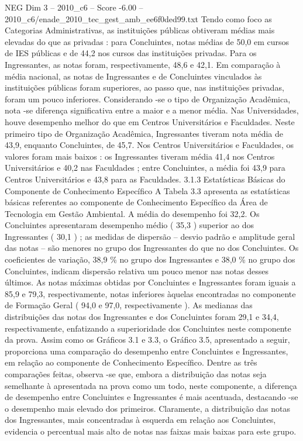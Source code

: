\begin{textsample}{NEG Dim 3 – 2010\_c6 – Score -6.00 – 2010\_c6/enade\_2010\_tec\_gest\_amb\_ee6f0ded99.txt}
Tendo como foco as Categorias Administrativas, as instituições públicas obtiveram médias mais elevadas do que as privadas : para Concluintes, notas médias de 50,0 em cursos de IES públicas e de 44,2 nos cursos das instituições privadas.
Para os Ingressantes, as notas foram, respectivamente, 48,6 e 42,1.
Em comparação à média nacional, as notas de Ingressantes e de Concluintes vinculados às instituições públicas foram superiores, ao passo que, nas instituições privadas, foram um pouco inferiores.
Considerando -se o tipo de Organização Acadêmica, nota -se diferença significativa entre a maior e a menor média.
Nas Universidades, houve desempenho melhor do que em Centros Universitários e Faculdades.
Neste primeiro tipo de Organização Acadêmica, Ingressantes tiveram nota média de 43,9, enquanto Concluintes, de 45,7.
Nos Centros Universitários e Faculdades, os valores foram mais baixos : os Ingressantes tiveram média 41,4 nos Centros Universitários e 40,2 nas Faculdades ; entre Concluintes, a média foi 43,9 para Centros Universitários e 43,8 para as Faculdades. 3.1.3 Estatísticas Básicas do Componente de Conhecimento Específico A Tabela 3.3 apresenta as estatísticas básicas referentes ao componente de Conhecimento Específico da Área de Tecnologia em Gestão Ambiental.
A média do desempenho foi 32,2.
Os Concluintes apresentaram desempenho médio ( 35,3 ) superior ao dos Ingressantes ( 30,1 ) ; as medidas de dispersão – desvio padrão e amplitude geral das notas – são menores no grupo dos Ingressantes do que no dos Concluintes.
Os coeficientes de variação, 38,9 \% no grupo dos Ingressantes e 38,0 \% no grupo dos Concluintes, indicam dispersão relativa um pouco menor nas notas desses últimos.
As notas máximas obtidas por Concluintes e Ingressantes foram iguais a 85,9 e 79,3, respectivamente, notas inferiores àquelas encontradas no componente de Formação Geral ( 94,0 e 97,0, respectivamente ).
As medianas das distribuições das notas dos Ingressantes e dos Concluintes foram 29,1 e 34,4, respectivamente, enfatizando a superioridade dos Concluintes neste componente da prova.
Assim como os Gráficos 3.1 e 3.3, o Gráfico 3.5, apresentado a seguir, proporciona uma comparação do desempenho entre Concluintes e Ingressantes, em relação ao componente de Conhecimento Específico.
Dentre as três comparações feitas, observa -se que, embora a distribuição das notas seja semelhante à apresentada na prova como um todo, neste componente, a diferença de desempenho entre Concluintes e Ingressantes é mais acentuada, destacando -se o desempenho mais elevado dos primeiros.
Claramente, a distribuição das notas dos Ingressantes, mais concentradas à esquerda em relação aos Concluintes, evidencia o percentual mais alto de notas nas faixas mais baixas para este grupo.

\end{textsample}
